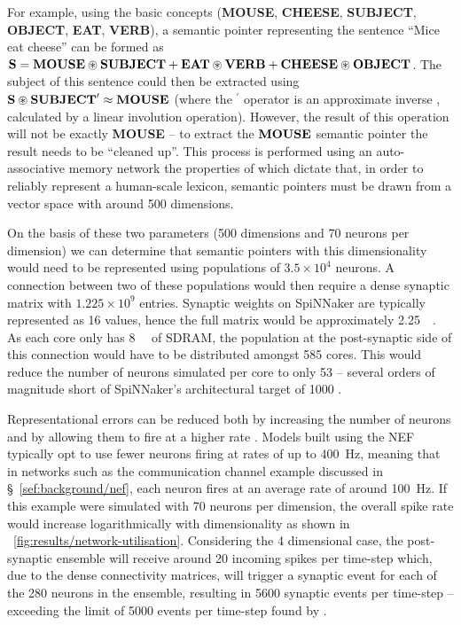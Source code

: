 \documentclass[conference]{IEEEtran}
\newcommand{\semanticpointer}{\textbf}
\newcommand{\msemanticpointer}[1]{\mbox{\semanticpointer{#1}}}
\begin{document}
For example, using the basic concepts (\semanticpointer{MOUSE}, \semanticpointer{CHEESE}, \semanticpointer{SUBJECT}, \semanticpointer{OBJECT}, \semanticpointer{EAT}, \semanticpointer{VERB}), a semantic pointer representing the sentence ``Mice eat cheese'' can be formed as $\msemanticpointer{S} = \msemanticpointer{MOUSE} \circledast \msemanticpointer{SUBJECT} + \msemanticpointer{EAT} \circledast \msemanticpointer{VERB} + \msemanticpointer{CHEESE} \circledast \msemanticpointer{OBJECT}$.
The subject of this sentence could then be extracted using $\msemanticpointer{S} \circledast \msemanticpointer{SUBJECT}^\prime \approx \msemanticpointer{MOUSE}$ (where the ${}^\prime$ operator is an approximate inverse \parencite[\S D.2]{eliasmith2013build}, calculated by a linear involution operation).
However, the result of this operation will not  be exactly \semanticpointer{MOUSE} -- to extract the $\msemanticpointer{MOUSE}$ semantic pointer the result needs to be ``cleaned up''.
This process is performed using an auto-associative memory network \parencite{Stewart2011} the properties of which dictate that, in order to reliably represent a human-scale lexicon, semantic pointers must be drawn from a vector space with around 500 dimensions.

On the basis of these two parameters (500 dimensions and 70 neurons per dimension) we can determine that semantic pointers with this dimensionality would need to be represented using populations of $3.5\times10^4$ neurons.
A connection between two of these populations would then require a dense synaptic matrix with $1.225\times10^9$ entries.
Synaptic weights on SpiNNaker are typically represented as \SI{16}{\bit} values, hence the full matrix would be approximately \SI{2.25}{\gibi\byte}.
As each core only has \SI{8}{\mebi\byte} of SDRAM, the population at the post-synaptic side of this connection would have to be distributed amongst 585 cores.
This would reduce the number of neurons simulated per core to only 53 -- several orders of magnitude short of SpiNNaker's architectural target of 1000 \parencite{Furber2007}. 

Representational errors can be reduced both by increasing the number of neurons and by allowing them to fire at a higher rate \parencite{Eliasmith2004}.
Models built using the NEF typically opt to use fewer neurons firing at rates of up to \SI{400}{\hertz}, meaning that in networks such as the communication channel example discussed in \S~\ref{sef:background/nef}, each neuron fires at an average rate of around \SI{100}{\hertz}.
If this example were simulated with 70 neurons per dimension, the overall spike rate would increase logarithmically with dimensionality as shown in \figurename~\ref{fig:results/network-utilisation}.
Considering the 4 dimensional case, the post-synaptic ensemble will receive around 20 incoming spikes per time-step which, due to the dense connectivity matrices, will trigger a synaptic event for each of the 280 neurons in the ensemble, resulting in 5600 synaptic events per time-step -- exceeding the limit of 5000 events per time-step found by \textcite{Sharp2013}.
\end{document}
